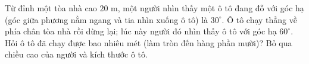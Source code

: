 \begin{bt}%
	Từ đỉnh một tòa nhà cao $20\text{ m}$, một người nhìn thấy một ô tô đang đỗ với góc hạ (góc giữa phương nằm ngang và tia nhìn xuống ô tô) là $30^\circ$. Ô tô chạy thẳng về phía chân tòa nhà rồi dừng lại; lúc này người đó nhìn thấy ô tô với góc hạ $60^\circ$. Hỏi ô tô đã chạy được bao nhiêu mét (làm tròn đến hàng phần mười)? Bỏ qua chiều cao của người và kích thước ô tô.
\end{bt}
